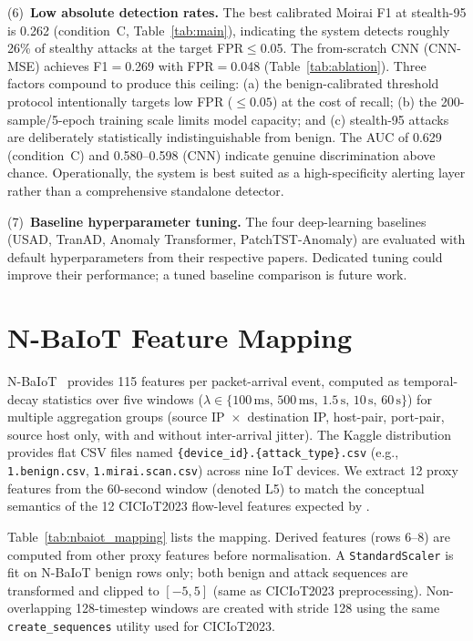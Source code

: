 (6)~\textbf{Low absolute detection rates.}
The best calibrated Moirai F1 at stealth-95 is 0.262 (condition~C, Table~\ref{tab:main}),
indicating the system detects roughly 26\% of stealthy attacks at the target
FPR$\leq$0.05.
The from-scratch CNN (CNN-MSE) achieves F1$=$0.269 with FPR$=$0.048
(Table~\ref{tab:ablation}).
Three factors compound to produce this ceiling: (a) the benign-calibrated threshold
protocol intentionally targets low FPR ($\leq 0.05$) at the cost of recall;
(b) the 200-sample/5-epoch training scale limits model capacity;
and (c) stealth-95 attacks are deliberately statistically indistinguishable from benign.
The AUC of 0.629 (condition~C) and 0.580--0.598 (CNN) indicate genuine discrimination
above chance.
Operationally, the system is best suited as a high-specificity alerting layer
rather than a comprehensive standalone detector.

(7)~\textbf{Baseline hyperparameter tuning.}
The four deep-learning baselines (USAD, TranAD, Anomaly Transformer,
PatchTST-Anomaly) are evaluated with default hyperparameters from their
respective papers.  Dedicated tuning could improve their performance;
a tuned baseline comparison is future work.

\section{N-BaIoT Feature Mapping}
\label{app:nbaiot}

N-BaIoT~\cite{meidan2018n} provides 115 features per packet-arrival event,
computed as temporal-decay statistics over five windows
($\lambda \in \{100\,\text{ms},\,500\,\text{ms},\,1.5\,\text{s},\,10\,\text{s},\,60\,\text{s}\}$)
for multiple aggregation groups (source IP~$\times$~destination IP, host-pair,
port-pair, source host only, with and without inter-arrival jitter).
The Kaggle distribution provides flat CSV files named \texttt{\{device\_id\}.\{attack\_type\}.csv}
(e.g., \texttt{1.benign.csv}, \texttt{1.mirai.scan.csv}) across nine IoT devices.
We extract 12 proxy features from the 60-second window (denoted L5) to
match the conceptual semantics of the 12 CICIoT2023 flow-level features
expected by \ours{}.

Table~\ref{tab:nbaiot_mapping} lists the mapping.
Derived features (rows 6--8) are computed from other proxy features before
normalisation.  A \texttt{StandardScaler} is fit on N-BaIoT benign rows
only; both benign and attack sequences are transformed and clipped to
$[-5, 5]$ (same as CICIoT2023 preprocessing).  Non-overlapping 128-timestep
windows are created with stride 128 using the same \texttt{create\_sequences}
utility used for CICIoT2023.

